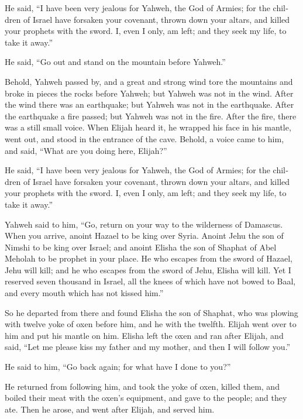 \begin{paracol}{2}
\begin{otherlanguage}{english}
 He said, ``I have been very jealous for Yahweh, the God
of Armies; for the children of Israel have forsaken your covenant,
thrown down your altars, and killed your prophets with the sword. I,
even I only, am left; and they seek my life, to take it away.''

 He said, ``Go out and stand on the mountain before
Yahweh.''

Behold, Yahweh passed by, and a great and strong wind tore the mountains
and broke in pieces the rocks before Yahweh; but Yahweh was not in the
wind. After the wind there was an earthquake; but Yahweh was not in the
earthquake.  After the earthquake a fire passed; but
Yahweh was not in the fire. After the fire, there was a still small
voice.  When Elijah heard it, he wrapped his face in his
mantle, went out, and stood in the entrance of the cave. Behold, a voice
came to him, and said, ``What are you doing here, Elijah?''

 He said, ``I have been very jealous for Yahweh, the God
of Armies; for the children of Israel have forsaken your covenant,
thrown down your altars, and killed your prophets with the sword. I,
even I only, am left; and they seek my life, to take it away.''

 Yahweh said to him, ``Go, return on your way to the
wilderness of Damascus. When you arrive, anoint Hazael to be king over
Syria.  Anoint Jehu the son of Nimshi to be king over
Israel; and anoint Elisha the son of Shaphat of Abel Meholah to be
prophet in your place.  He who escapes from the sword of
Hazael, Jehu will kill; and he who escapes from the sword of Jehu,
Elisha will kill.  Yet I reserved seven thousand in
Israel, all the knees of which have not bowed to Baal, and every mouth
which has not kissed him.''

 So he departed from there and found Elisha the son of
Shaphat, who was plowing with twelve yoke of oxen before him, and he
with the twelfth. Elijah went over to him and put his mantle on him.
 Elisha left the oxen and ran after Elijah, and said,
``Let me please kiss my father and my mother, and then I will follow
you.''

He said to him, ``Go back again; for what have I done to you?''

 He returned from following him, and took the yoke of
oxen, killed them, and boiled their meat with the oxen's equipment, and
gave to the people; and they ate. Then he arose, and went after Elijah,
and served him.


\end{otherlanguage}
\end{paracol}
